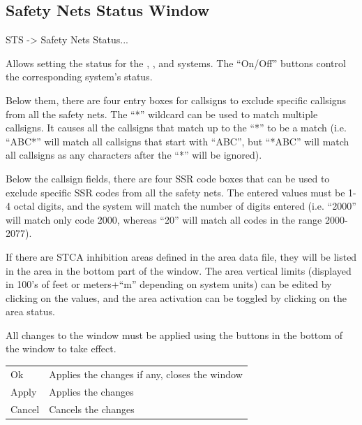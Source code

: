 \documentclass[a4paper,oneside,11pt]{memoir}
\begin{document}
\subsection{Safety Nets Status Window}
\label{win:snsw}

 STS -> Safety Nets Status...

\bigskip


Allows setting the status for the , ,  and  systems. The “On/Off” buttons control the corresponding system’s status.

\bigskip

Below them, there are four entry boxes for callsigns to exclude specific callsigns from all the safety nets. The “*” wildcard can be used to match multiple callsigns. It causes all the callsigns that match up to the “*” to be a match (i.e. “ABC*” will match all callsigns that start with “ABC”, but “*ABC” will match all callsigns as any characters after the “*” will be ignored).

\bigskip

Below the callsign fields, there are four SSR code boxes that can be used to exclude specific SSR codes from all the safety nets. The entered values must be 1-4 octal digits, and the system will match the number of digits entered (i.e. “2000” will match only code 2000, whereas “20” will match all codes in the range 2000-2077).

\bigskip

If there are STCA inhibition areas defined in the area data file, they will be listed in the area in the bottom part of the window. The area vertical limits (displayed in 100’s of feet or meters+“m” depending on system units) can be edited by clicking on the values, and the area activation can be toggled by clicking on the area status.

\bigskip

All changes to the window must be applied using the buttons in the bottom of the window to take effect.

\bigskip

\begin{longtable}{p{2.5cm} p{10cm}}
    Ok      & Applies the changes if any, closes the window\\
    Apply   & Applies the changes\\
    Cancel  & Cancels the changes\\
\end{longtable}
\end{document}
